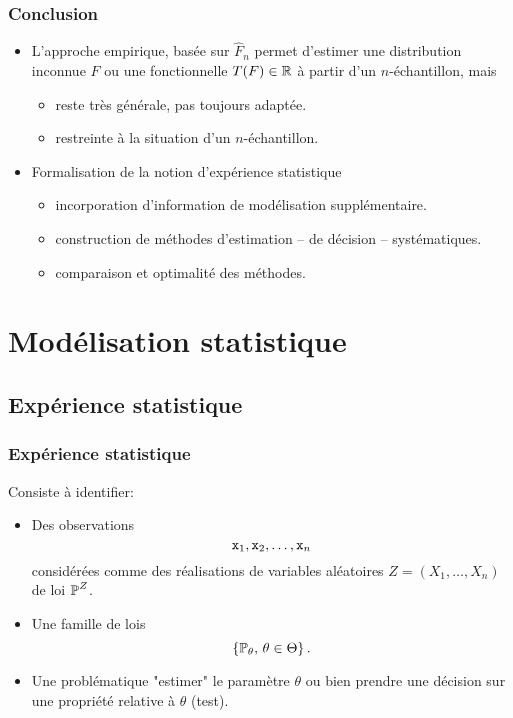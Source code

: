 \begin{frame}
\frametitle{Conclusion}
\begin{itemize}
\item \alert{L'approche empirique}, basée sur $\widehat F_n$ permet d'estimer une distribution inconnue $F$ ou une fonctionnelle $T(F)\in \operatorname{{\mathbb R}}$ à partir d'un $n$-échantillon, mais
\begin{itemize}
\item reste très générale, pas toujours adaptée.
\item restreinte à la situation d'un $n$-échantillon.
\end{itemize}
\item Formalisation de la notion \alert{d'expérience statistique }
\begin{itemize}
\item incorporation d'information de modélisation \alert{supplémentaire}.
\item construction de méthodes d'estimation -- de décision -- \alert{systématiques}.
\item comparaison et \alert{optimalité} des méthodes.
\end{itemize}
\end{itemize}
\end{frame}

\section{Modélisation statistique}
\subsection{Expérience statistique}
\begin{frame}
\frametitle{Expérience statistique} Consiste à identifier:
\begin{itemize}
\item \alert{Des observations}
$${\tt x}_1,{\tt x}_2,\ldots, {\tt x}_n$$
\alert{considérées} comme des \alert{réalisations} de variables aléatoires $Z = (X_1,\ldots, X_n)$ de loi $\operatorname{{\mathbb P}}^Z$.
\item \alert{Une famille de lois}
$$\left\{\operatorname{{\mathbb P}}_\theta,\,\theta \in \Theta\right\}.$$
\item \alert{Une problématique} "estimer" le paramètre $\theta$ ou bien prendre une décision sur une propriété relative à $\theta$ (test).
\end{itemize}
\end{frame}

